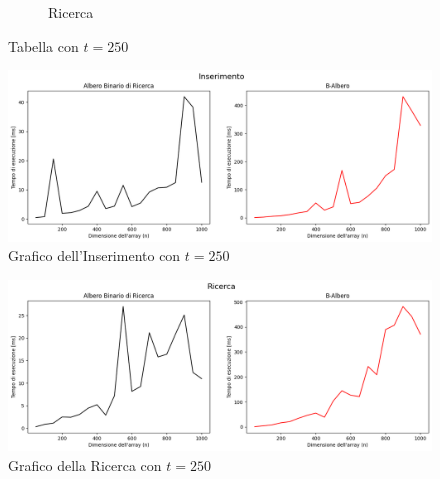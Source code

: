 \begin{figure}[H]
\begin{subfigure}[b]{0.49\textwidth}
        \caption{Ricerca}
        \label{fig:tablesearchtimet250}
    \end{subfigure}
    \caption{Tabella con $t=250$}
    \label{fig:tabletimest250}
\end{figure}

\begin{figure}[H]
    \centering
    \includegraphics[width=\textwidth]{side-graphs/insert-ms-t250.png}
    \caption{Grafico dell'Inserimento con $t=250$}
        \label{fig:sidegraphinserttimet250}
\end{figure}
    
\begin{figure}[H]
    \centering
    \includegraphics[width=\textwidth]{side-graphs/search-ms-t250.png}
    \caption{Grafico della Ricerca con $t=250$}    \label{fig:sidegraphsearchtimet250}
\end{figure}

